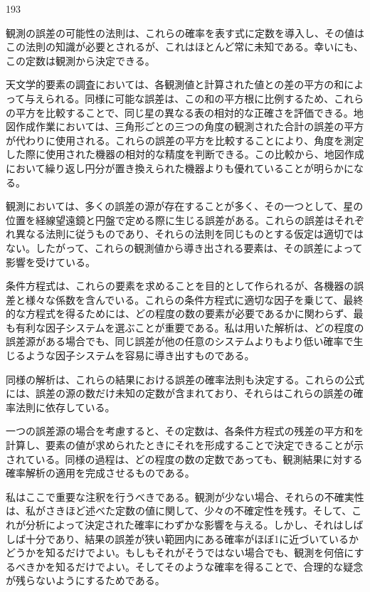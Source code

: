\documentclass[a4paper,11pt,openany]{ltjsbook}
\begin{document}
193

観測の誤差の可能性の法則は、これらの確率を表す式に定数を導入し、その値はこの法則の知識が必要とされるが、これはほとんど常に未知である。幸いにも、この定数は観測から決定できる。

天文学的要素の調査においては、各観測値と計算された値との差の平方の和によって与えられる。同様に可能な誤差は、この和の平方根に比例するため、これらの平方を比較することで、同じ星の異なる表の相対的な正確さを評価できる。地図作成作業においては、三角形ごとの三つの角度の観測された合計の誤差の平方が代わりに使用される。これらの誤差の平方を比較することにより、角度を測定した際に使用された機器の相対的な精度を判断できる。この比較から、地図作成において繰り返し円分が置き換えられた機器よりも優れていることが明らかになる。

観測においては、多くの誤差の源が存在することが多く、その一つとして、星の位置を経線望遠鏡と円盤で定める際に生じる誤差がある。これらの誤差はそれぞれ異なる法則に従うものであり、それらの法則を同じものとする仮定は適切ではない。したがって、これらの観測値から導き出される要素は、その誤差によって影響を受けている。

条件方程式は、これらの要素を求めることを目的として作られるが、各機器の誤差と様々な係数を含んでいる。これらの条件方程式に適切な因子を乗じて、最終的な方程式を得るためには、どの程度の数の要素が必要であるかに関わらず、最も有利な因子システムを選ぶことが重要である。私は用いた解析は、どの程度の誤差源がある場合でも、同じ誤差が他の任意のシステムよりもより低い確率で生じるような因子システムを容易に導き出すものである。

同様の解析は、これらの結果における誤差の確率法則も決定する。これらの公式には、誤差の源の数だけ未知の定数が含まれており、それらはこれらの誤差の確率法則に依存している。

一つの誤差源の場合を考慮すると、その定数は、各条件方程式の残差の平方和を計算し、要素の値が求められたときにそれを形成することで決定できることが示されている。同様の過程は、どの程度の数の定数であっても、観測結果に対する確率解析の適用を完成させるものである。

私はここで重要な注釈を行うべきである。観測が少ない場合、それらの不確実性は、私がさきほど述べた定数の値に関して、少々の不確定性を残す。そして、これが分析によって決定された確率にわずかな影響を与える。しかし、それはしばしば十分であり、結果の誤差が狭い範囲内にある確率がほぼ1に近づいているかどうかを知るだけでよい。もしもそれがそうではない場合でも、観測を何倍にするべきかを知るだけでよい。そしてそのような確率を得ることで、合理的な疑念が残らないようにするためである。
\end{document}
